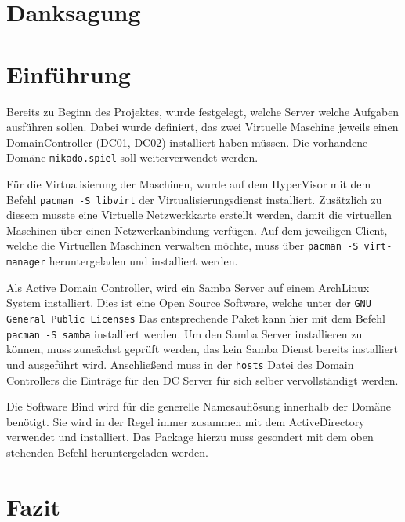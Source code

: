 \chapter*{Danksagung}

\newpage

\tableofcontents
\listoffigures
\begingroup
\let\clearpage\relax
\lstlistoflistings{}
\listoftables
\endgroup

\chapter{Einführung}
\label{chap:einfuehrung}

\label{Vorbereitung}
Bereits zu Beginn des Projektes, wurde festgelegt, welche Server welche
Aufgaben ausführen sollen. Dabei wurde definiert, das zwei Virtuelle Maschine
jeweils einen DomainController (DC01, DC02) installiert haben müssen. Die 
vorhandene Domäne \texttt{mikado.spiel} soll weiterverwendet werden.

Für die Virtualisierung der Maschinen, wurde auf dem HyperVisor mit dem 
Befehl \texttt{pacman -S libvirt} der Virtualisierungsdienst installiert.
Zusätzlich zu diesem musste eine Virtuelle Netzwerkkarte erstellt werden,
damit die virtuellen Maschinen über einen Netzwerkanbindung verfügen.
Auf dem jeweiligen Client, welche die Virtuellen Maschinen verwalten möchte,
muss über \texttt{pacman -S virt-manager} heruntergeladen und installiert
werden.


\label{Samba}
Als Active Domain Controller, wird ein Samba Server auf einem ArchLinux
System installiert. Dies ist eine Open Source Software, welche unter der
\texttt{GNU General Public Licenses} Das entsprechende Paket kann hier mit dem Befehl
\texttt{pacman -S samba} installiert werden. Um den Samba Server installieren
zu können, muss zuneächst geprüft werden, das kein Samba Dienst bereits
installiert und ausgeführt wird. Anschließend muss in der \texttt{hosts} Datei
des Domain Controllers die Einträge für den DC Server für sich selber
vervollständigt werden.

\label {Bind}
Die Software Bind wird für die generelle Namesauflösung innerhalb der Domäne
benötigt. Sie wird in der Regel immer zusammen mit dem ActiveDirectory
verwendet und installiert. Das Package hierzu muss gesondert mit dem oben
stehenden Befehl heruntergeladen werden.
\chapter{Fazit}

